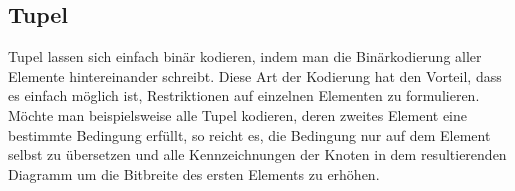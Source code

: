 \subsection{Tupel}
Tupel lassen sich einfach binär kodieren, indem man die Binärkodierung aller Elemente hintereinander schreibt.
Diese Art der Kodierung hat den Vorteil, dass es einfach möglich ist, Restriktionen auf einzelnen Elementen zu formulieren.
Möchte man beispielsweise alle Tupel kodieren, deren zweites Element eine bestimmte Bedingung erfüllt, so reicht es, die Bedingung nur auf dem Element selbst zu übersetzen und alle Kennzeichnungen der Knoten in dem resultierenden Diagramm um die Bitbreite des ersten Elements zu erhöhen.